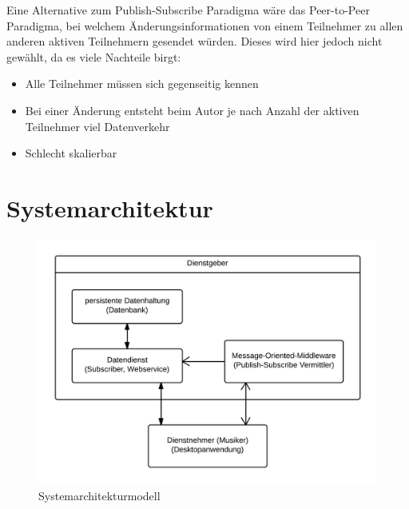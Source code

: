 \documentclass[12pt]{scrartcl}
\begin{document}
Eine Alternative zum Publish-Subscribe Paradigma wäre das Peer-to-Peer Paradigma, bei welchem Änderungsinformationen von einem Teilnehmer zu allen anderen aktiven Teilnehmern gesendet würden. Dieses wird hier jedoch nicht gewählt, da es viele Nachteile birgt:
\begin{itemize}
\item Alle Teilnehmer müssen sich gegenseitig kennen
\item Bei einer Änderung entsteht beim Autor je nach Anzahl der aktiven Teilnehmer viel Datenverkehr
\item Schlecht skalierbar
\end{itemize}


\section{Systemarchitektur}




\begin{figure}
\centering
\includegraphics[scale=.25]{figures/systemarchitekturmodell}
\caption{Systemarchitekturmodell}
\label{fig:systemarchitekturmodell}
\end{figure}
\end{document}
